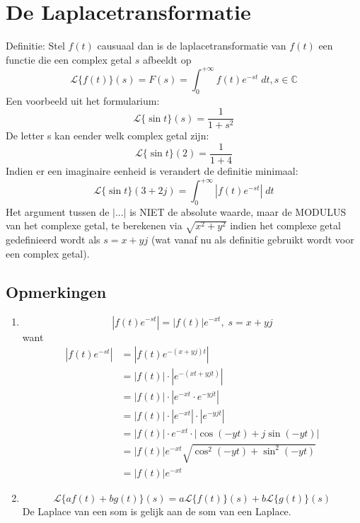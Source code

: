 \documentclass[12pt]{report}
\begin{document}
\section{De Laplacetransformatie}
Definitie: Stel $f(t)$ causuaal dan is de laplacetransformatie van $f(t)$ een functie die een complex getal $s$ afbeeldt op 
$$\mathcal{L}\{f(t)\}(s) = F(s) = \int_{0}^{+\infty}f(t)e^{-st}\;dt, s \in \mathbb{C}$$
Een voorbeeld uit het formularium:
$$\mathcal{L}\{\sin t\}(s) = \frac{1}{1 + s^2}$$
De letter s kan eender welk complex getal zijn:
$$\mathcal{L}\{\sin t\}(2) = \frac{1}{1 + 4}$$
Indien er een imaginaire eenheid is verandert de definitie minimaal:
$$\mathcal{L}\{\sin t\}(3 + 2j) = \int_{0}^{+\infty}|f(t)e^{-st}|\;dt$$
Het argument tussen de $| ... |$ is NIET de absolute waarde, maar de MODULUS van het complexe getal, te berekenen via $\sqrt{x^2 + y^2}$ indien het complexe getal gedefinieerd wordt als $s = x + yj$ (wat vanaf nu als definitie gebruikt wordt voor een complex getal).
\subsection{Opmerkingen}
\begin{enumerate}
 \item $$|f(t)e^{-st}| = |f(t)|e^{-xt}, \; s = x+yj$$
 want
 \begin{equation*}
  \begin{split}
   |f(t)e^{-st}| & = |f(t)e^{-(x + yj)t}| \\
                 & = |f(t)|\cdot|e^{-(xt + yjt)}| \\
                 & = |f(t)|\cdot|e^{-xt} \cdot e^{-yjt}| \\
                 & = |f(t)|\cdot|e^{-xt}|\cdot|e^{-yjt}| \\
                 & = |f(t)|\cdot e^{-xt}\cdot|\cos(-yt) + j\sin(-yt)| \\
                 & = |f(t)|e^{-xt}\sqrt{\cos^2{(-yt)} + \sin^2{(-yt)}} \\
                 & = |f(t)|e^{-xt}
  \end{split}
 \end{equation*}
 \item 
 $$\mathcal{L}\{af(t) + bg(t)\}(s) = a\mathcal{L}\{f(t)\}(s) + b\mathcal{L}\{g(t)\}(s)$$
 De Laplace van een som is gelijk aan de som van een Laplace.
\end{enumerate}
\end{document}
